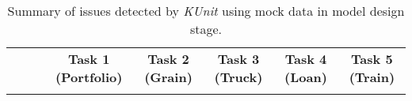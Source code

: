 
\begin{table*}[]
\huge
\caption{Summary of issues detected by {\em KUnit} using mock data in model design stage.}
\renewcommand{\arraystretch}{1}

\begin{adjustbox}{width=\textwidth,center}

\begin{tabular}{|cll|ccc|ccc|ccc|ccc|ccc|}
\hline
\rowcolor[HTML]{BFBFBF} 
\multicolumn{1}{|c|}{\cellcolor[HTML]{BFBFBF}}                                                                            & \multicolumn{2}{c|}{\cellcolor[HTML]{BFBFBF}}                                                                                                                                                                                                & \multicolumn{3}{c|}{\cellcolor[HTML]{BFBFBF}\textbf{Task 1 (Portfolio)}}                                                                                                                                                                                                              & \multicolumn{3}{c|}{\cellcolor[HTML]{BFBFBF}\textbf{Task 2 (Grain)}}                                                                                                                                                                                                                  & \multicolumn{3}{c|}{\cellcolor[HTML]{BFBFBF}\textbf{Task 3 (Truck)}}                                                                                                                                                                                                                   & \multicolumn{3}{c|}{\cellcolor[HTML]{BFBFBF}\textbf{Task 4 (Loan)}}                                                                                                                                                                                                                   & \multicolumn{3}{c|}{\cellcolor[HTML]{BFBFBF}\textbf{Task 5 (Train)}}                                                                                                                                                                                                                  \\ \cline{4-18} 
\rowcolor[HTML]{BFBFBF} 

\end{tabular}
\end{adjustbox}
\end{table*}
